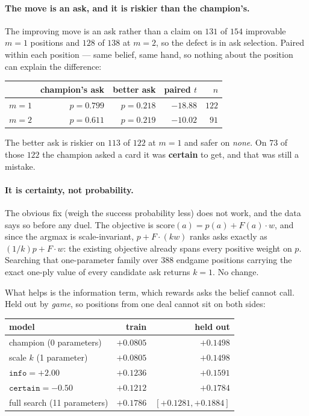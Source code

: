 \documentclass[11pt,letterpaper]{article}
\begin{document}
\paragraph{The move is an ask, and it is riskier than the champion's.} The
improving move is an ask rather than a claim on $131$ of $154$ improvable
$m = 1$ positions and $128$ of $138$ at $m = 2$, so the defect is in ask
selection. Paired within each position --- same belief, same hand, so nothing
about the position can explain the difference:

\begin{center}
\begin{tabular}{lrrrr}
\toprule
& champion's ask & better ask & paired $t$ & $n$ \\
\midrule
$m = 1$ & $p = 0.799$ & $p = 0.218$ & $-18.88$ & $122$ \\
$m = 2$ & $p = 0.611$ & $p = 0.219$ & $-10.02$ & $91$ \\
\bottomrule
\end{tabular}
\end{center}

The better ask is riskier on $113$ of $122$ at $m = 1$ and safer on
\emph{none}. On $73$ of those $122$ the champion asked a card it was
\textbf{certain} to get, and that was still a mistake.

\paragraph{It is certainty, not probability.} The obvious fix (weigh
the success probability less) does not work, and the data says so before any
duel. The objective is $\mathrm{score}(a) = p(a) + F(a)\cdot w$, and since the
argmax is scale-invariant, $p + F\cdot(kw)$ ranks asks exactly as
$(1/k)p + F\cdot w$: the existing objective already spans every positive weight
on $p$. Searching that one-parameter family over $388$ endgame positions
carrying the exact one-ply value of every candidate ask returns $k = 1$. No
change.

What helps is the information term, which rewards asks the belief cannot call.
Held out by \emph{game}, so positions from one deal cannot sit on both sides:

\begin{center}
\begin{tabular}{lrr}
\toprule
model & train & held out \\
\midrule
champion (0 parameters)      & $+0.0805$ & $+0.1498$ \\
scale $k$ (1 parameter)      & $+0.0805$ & $+0.1498$ \\
$\mathtt{info} = +2.00$      & $+0.1236$ & $+0.1591$ \\
$\mathtt{certain} = -0.50$   & $+0.1212$ & $+0.1784$ \\
full search (11 parameters)  & $+0.1786$ & $[+0.1281, +0.1884]$ \\
\bottomrule
\end{tabular}
\end{center}
\end{document}
